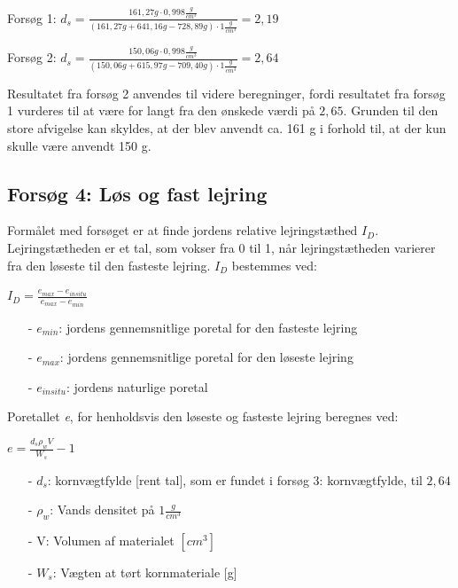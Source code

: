 \begin{center}
	Forsøg 1: $d_{s} = \frac{161,\!27 g \cdot 0,\!998 \frac{g}{cm^3}}{(161,\!27 g + 641,\!16 g - 728,\!89 g)\cdot 1 \frac{g}{cm^3}} = 2,\!19$
\end{center}
\begin{center}
	Forsøg 2: $d_{s} = \frac{150,\!06 g \cdot 0,\!998 \frac{g}{cm^3}}{(150,\!06 g + 615,\!97 g - 709,\!40 g)\cdot 1 \frac{g}{cm^3}} = 2,\!64$
\end{center} 

Resultatet fra forsøg 2 anvendes til videre beregninger, fordi resultatet fra forsøg 1 vurderes til at være for langt fra den ønskede værdi på $2,\!65$. Grunden til den store afvigelse kan skyldes, at der blev anvendt ca. 161 g i forhold til, at der kun skulle være anvendt 150 g.

\subsection{Forsøg 4: Løs og fast lejring}
Formålet med forsøget er at finde jordens relative lejringstæthed $I_D$. Lejringstætheden er et tal, som vokser fra 0 til 1, når lejringstætheden varierer fra den løseste til den fasteste lejring.
\newline
\newline
$I_D$ bestemmes ved:

\begin{center}
	$I_D = \frac{e_{max} - e_{in situ}}{e_{max} - e_{min}}$
\end{center}

\begin{itemize}
	\item[-] $e_{min}$: jordens gennemsnitlige poretal for den fasteste lejring 
	\item[-] $e_{max}$: jordens gennemsnitlige poretal for den løseste lejring
	\item[-] $e_{in situ}$: jordens naturlige poretal 
\end{itemize}

Poretallet \textit{e}, for henholdsvis den løseste og fasteste lejring beregnes ved:

\begin{center}
	$e = \frac{d_s \rho_w  V}{W_s} - 1$
\end{center}

\begin{itemize}
	\item[-] $d_s$: kornvægtfylde [rent tal], som er fundet i forsøg 3: kornvægtfylde, til $2,\!64$ 
	\item[-] $\rho_w$: Vands densitet på $1 \frac{g}{cm^3}$
	\item[-] V: Volumen af materialet $[cm^3]$
	\item[-] $W_s$: Vægten at tørt kornmateriale [g]
\end{itemize}
 
